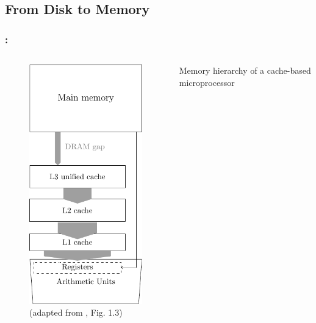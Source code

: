 \documentclass[9pt,xcolor=table]{beamer}
\begin{document}
\subsection{From Disk to Memory}
\begin{frame}
\frametitle{\insertsectionhead{}: \insertsubsection{}}
\begin{columns}[c]
  \begin{column}{.45\textwidth}
    \begin{figure}[htb]
      \includegraphics[height=0.78\textheight]{tikz/dram_gap}\\[2pt]\footnotesize
      (adapted from \cite{HagerWelleinIntroHPC}, Fig. 1.3)
    \end{figure}
  \end{column}
  \begin{column}{.45\textwidth}
    \vfill
    \begin{block}{Memory hierarchy of a cache-based microprocessor}
      \begin{itemize}

\end{itemize}
\end{block}
\end{column}
\end{columns}
\end{frame}
\end{document}
